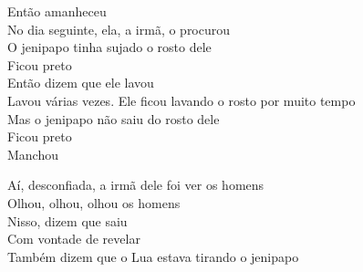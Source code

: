 \begin{linenumbers}\begingroup\raggedright
\noindent Então amanheceu\\
No dia seguinte, ela, a irmã, o procurou\\
O jenipapo tinha sujado o rosto dele\\
Ficou preto\\
Então dizem que ele lavou\\
Lavou várias vezes. Ele ficou lavando o rosto por muito tempo\\
Mas o jenipapo não saiu do rosto dele\\
Ficou preto\\
Manchou
\end{linenumbers}\endgroup

\bigskip

\begin{linenumbers}\begingroup\raggedright
\noindent Aí, desconfiada, a irmã dele foi ver os homens\\
Olhou, olhou, olhou os homens\\
Nisso, dizem que saiu\\
Com vontade de revelar\\
Também dizem que o Lua estava tirando o jenipapo
\end{linenumbers}\endgroup

\bigskip

